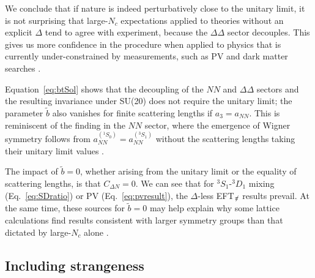 \documentclass[nofootinbib, preprint, aps, prc, superscriptaddress,11pt]{revtex4-1}
\newcommand{\Nc}{\ensuremath{N_c}\xspace}
\newcommand{\NN}{\ensuremath{N\!N}\xspace}
\newcommand{\threeS}{\ensuremath{{{}^{3}\!S_1}}\xspace}
\newcommand{\threeD}{\ensuremath{{{}^{3}\!D_1}}\xspace}
\newcommand\SD{\ensuremath{\threeS\text{-}\threeD}\xspace}
\newcommand{\1}{\mathbbm{1}}
\newcommand{\bt}{\ensuremath{\tilde{b}}\xspace}
\newcommand{\asing}{\ensuremath{a_{\NN}^{(^1 \! S_0)}}\xspace}
\newcommand{\atrip}{\ensuremath{a_{\NN}^{(^3 \! S_1)}}\xspace}
\newcommand{\aNN}{\ensuremath{a_{\NN}}\xspace}
\newcommand{\aDDthreezero}{\ensuremath{a_3}\xspace}
\newcommand{\nopi}{\ensuremath{\pi\hskip-0.40em /}}
\newcommand{\eftnopi}{EFT$_{\nopi}$\xspace}
\newcommand{\D}{\ensuremath{\Delta}\xspace}
\newcommand{\DD}{\ensuremath{\Delta\Delta}\xspace}
\begin{document}
We conclude that if nature is indeed perturbatively close to the unitary limit, it is not surprising that large-\Nc expectations applied to theories without an explicit \D tend to agree with experiment, because the \DD sector decouples. This gives us more confidence in the procedure when applied to physics that is currently under-constrained by measurements, such as PV and dark matter searches \cite{Richardson:2021liq}.

Equation~\eqref{eq:btSol} shows that the decoupling of the \NN and \DD sectors and the resulting invariance under SU(20) does not require the unitary limit; the parameter \bt also vanishes for finite scattering lengths if $\aDDthreezero = \aNN$.
This is  reminiscent of the finding in the \NN sector, where the emergence of Wigner symmetry follows from $\asing=\atrip$ without the scattering lengths taking their unitary limit values \cite{Mehen:1999qs}.

The impact of $\bt=0$, whether arising from the unitary limit or the equality of scattering lengths, is that $C_{\Delta N}=0$.
We can see that
for \SD mixing (Eq.~\eqref{eq:SDratio}) or PV (Eq.~\eqref{eq:pvresult}), the \D-less \eftnopi results prevail.
At the same time, these sources for $\bt=0$ may help explain why some lattice calculations find results consistent with larger symmetry groups than that dictated by large-\Nc alone \cite{Wagman:2017tmp,NPLQCD:2020lxg}.



\subsection{Including strangeness}
\label{sec:strange}
\end{document}
